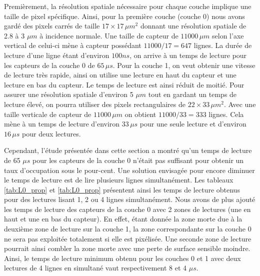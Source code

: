   Premi\`erement, la r\'esolution spatiale n\'ecessaire pour chaque couche implique une taille de pixel sp\'ecifique. Ainsi, pour la premi\`ere couche (couche 0) nous avons gardé des pixels carr\'es de taille $17 \times 17 \, \mu m^2$ donnant une r\'esolution spatiale de 2.8 \`a 3 $\mu m$ \`a incidence normale. Une taille de capteur de $11000 \, \mu m$ selon l'axe vertical de celui-ci m\`ene \`a capteur poss\'edant $11000/17=647$ lignes. La dur\'ee de lecture d'une ligne étant d'environ $100 ns$, on arrive \`a un temps de lecture pour les capteurs de la couche 0 de $65 \, \mu s$. Pour la couche 1, on veut obtenir une vitesse de lecture tr\`es rapide, ainsi on utilise une lecture en haut du capteur et une lecture en bas du capteur. Le temps de lecture est ainsi r\'eduit de moiti\'e. Pour assurer  une r\'esolution spatiale d'environ 5 $\mu m$ tout en gardant un temps de lecture \'elev\'e, on pourra utiliser des pixels rectangulaires de $22 \times 33 \, \mu m^2$. Avec une taille verticale de capteur de $11000 \, \mu m$ on obtient $11000/33 = 333$ lignes. Cela m\`ene \`a un temps de lecture d'environ $33 \, \mu s$ pour une seule lecture et d'environ $16 \, \mu s$ pour deux lectures.
  
  \medskip

  Cependant, l'\'etude pr\'esent\'ee dans cette section a montr\'e qu'un temps de lecture de 65 $\mu s$ pour les capteurs de la couche 0 n'\'etait pas suffisant pour obtenir un taux d'occupation sous le pour-cent. Une solution envisag\'ee pour encore diminuer le temps de lecture est de lire plusieurs lignes simultan\'ement. Les tableaux \ref{tab:L0_prop} et \ref{tab:L0_prop} pr\'esentent ainsi les temps de lecture obtenus pour des lectures lisant 1, 2 ou 4 lignes simultan\'ement. Nous avons de plus ajout\'e les temps de lecture des capteurs de la couche 0 avec 2 zones de lectures (une en haut et une en bas du capteur). En effet, \'etant donn\'ee la zone morte due \`a la deuxi\`eme zone de lecture sur la couche 1, la zone correspondante sur la couche 0 ne sera pas exploit\'ee totalement si elle est pix\'elis\'ee. Une seconde zone de lecture pourrait ainsi combler la zone morte avec une perte de surface sensible moindre. Ainsi, le temps de lecture minimum obtenu pour les couches 0 et 1 avec deux lectures de 4 lignes en simultan\'e vaut respectivement 8 et 4 $\mu s$.
  
